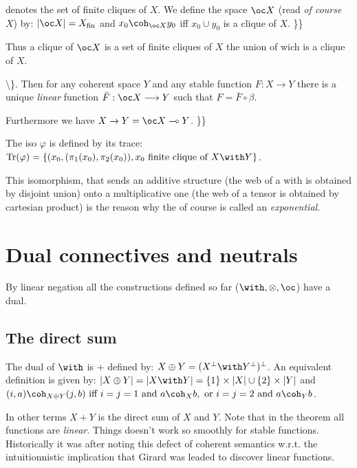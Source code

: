  denotes the set of finite cliques of \(X\). We define the space
\(\oc X\) (read \emph{of course \(X\)}) by:
\(\web{\oc X} = X_{\mathrm{fin}}\) and \(x_0\coh_{\oc X}y_0\) iff
\(x_0\cup y_0\) is a clique of \(X\). \}\}

Thus a clique of \(\oc X\) is a set of finite cliques of \(X\) the union
of wich is a clique of \(X\).

\textbackslash{}\}. Then for any coherent space \(Y\) and any stable
function \(F: X\longrightarrow Y\) there is a unique \emph{linear}
function \(\bar F:\oc X\longrightarrow Y\) such that
\(F = \bar F\circ \beta\).

Furthermore we have \(X\imp Y = \oc X\limp Y\). \}\}

The iso \(\varphi\) is defined by its trace:
\(\mathrm{Tr}(\varphi) = \{(x_0, (\pi_1(x_0), \pi_2(x_0)), x_0\text{ finite clique of } X\with Y\}\).

This isomorphism, that sends an additive structure (the web of a with is
obtained by disjoint union) onto a multiplicative one (the web of a
tensor is obtained by cartesian product) is the reason why the of course
is called an \emph{exponential}.

\section{Dual connectives and neutrals}\label{dual-connectives-and-neutrals}

By linear negation all the constructions defined so far
(\(\with, \tens, \oc\)) have a dual.

\subsection{The direct sum}\label{the-direct-sum}

The dual of \(\with\) is \(\plus\) defined by:
\(X\plus Y = (X\orth\with Y\orth)\orth\). An equivalent definition is
given by:
\(\web{X\plus Y} = \web{X\with Y} = \{1\}\times \web X \cup \{2\}\times\web Y\)
and
\((i, a)\coh_{X\plus Y} (j, b)\text{ iff } i = j = 1 \text{ and } a\coh_X b,\text{ or }i = j = 2\text{ and } a\coh_Y b\).

In other terms \(X\plus Y\) is the direct sum of \(X\) and \(Y\). Note
that in the theorem all functions are \emph{linear}. Things doesn't work
so smoothly for stable functions. Historically it was after noting this
defect of coherent semantics w.r.t. the intuitionnistic implication that
Girard was leaded to discover linear functions.

